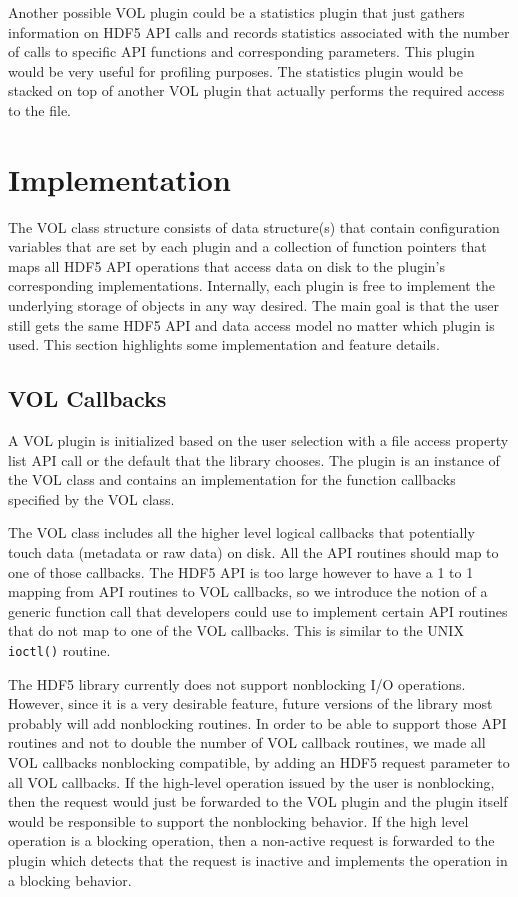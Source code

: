 \documentclass[letterpaper,hyper]{THG_RFC}
\begin{document}
Another possible VOL plugin could be a statistics plugin that just gathers information on HDF5 API calls and records statistics associated with the number of calls to specific API functions and corresponding parameters. This plugin would be very useful for profiling purposes. The statistics plugin would be stacked on top of another VOL plugin that actually performs the required access to the file.
\clearpage
\section{Implementation}
The VOL class structure consists of data structure(s) that contain configuration variables that are set by each plugin and a collection of function pointers that maps all HDF5 API operations that access data on disk to the plugin's corresponding implementations. Internally, each plugin is free to implement the underlying storage of objects in any way desired. The main goal is that the user still gets the same HDF5 API and data access model no matter which plugin is used. This section highlights some implementation and feature details.  

\subsection{VOL Callbacks}
A VOL plugin is initialized based on the user selection with a file access property list API call or the default that the library chooses. The plugin is an instance of the VOL class and contains an implementation for the function callbacks specified by the VOL class. 

The VOL class includes all the higher level logical callbacks that potentially touch data (metadata or raw data) on disk. All the API routines should map to one of those callbacks. The HDF5 API is too large however to have a 1 to 1 mapping from API routines to VOL callbacks, so we introduce the notion of a generic function call that developers could use to implement certain API routines that do not map to one of the VOL callbacks. This is similar to the UNIX \texttt{ioctl()} routine.

The HDF5 library currently does not support nonblocking I/O operations. However, since it is a very desirable feature, future versions of the library most probably will add nonblocking routines. In order to be able to support those API routines and not to double the number of VOL callback routines, we made all VOL callbacks nonblocking compatible, by adding an HDF5 request parameter to all VOL callbacks. If the high-level operation issued by the user is nonblocking, then the request would just be forwarded to the VOL plugin and the plugin itself would be responsible to support the nonblocking behavior. If the high level operation is a blocking operation, then a non-active request is forwarded to the plugin which detects that the request is inactive and implements the operation in a blocking behavior. 
\end{document}

